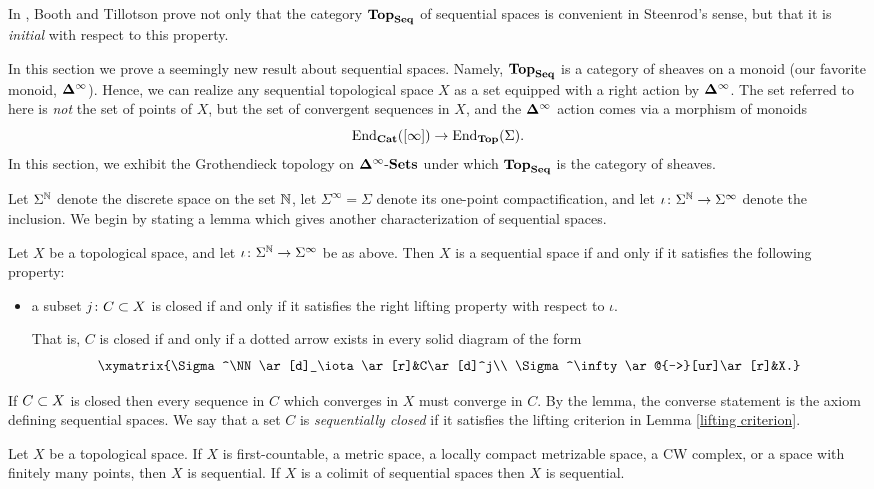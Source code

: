 \documentclass{amsart}
\def\Seq{{\bf Seq}}
\def\Del{{\bf \Delta}}
\def\dashSets{{\tn{-}\Sets}}
\def\Delinf{{\Del^\infty}}
\def\DSets{{\Delinf\dashSets}}
\begin{document}
In \cite[7.4]{BoT}, Booth and Tillotson prove not only that the category $\Top_\Seq$ of sequential spaces is convenient in Steenrod's sense, but that it is {\em initial} with respect to this property.  

In this section we prove a seemingly new result about sequential spaces.  Namely, $\Top_\Seq$ is a category of sheaves on a monoid (our favorite monoid, $\Delinf$).  Hence, we can realize any sequential topological space $X$ as a set equipped with a right action by $\Delinf$.  The set referred to here is {\em not} the set of points of $X$, but the set of convergent sequences in $X$, and the $\Delinf$ action comes via a morphism of monoids $$\End_\Cat([\infty])\to\End_\Top(\Sigma).$$  In this section, we exhibit the Grothendieck topology on $\DSets$ under which $\Top_\Seq$ is the category of sheaves.

Let $\Sigma^\NN$ denote the discrete space on the set $\NN$, let $\Sigma^\infty=\Sigma$ denote its one-point compactification, and let $\iota\taking\Sigma^\NN\to\Sigma^\infty$ denote the inclusion.  We begin by stating a lemma which gives another characterization of sequential spaces.

\begin{lemma}\label{lifting criterion}

Let $X$ be a topological space, and let $\iota\taking\Sigma^\NN\to\Sigma^\infty$ be as above.  Then $X$ is a sequential space if and only if it satisfies the following property: \begin{itemize}\item a subset $j\taking C\ss X$ is closed if and only if it satisfies the right lifting property with respect to $\iota$.

That is, $C$ is closed if and only if a dotted arrow exists in every solid diagram of the form $$\xymatrix{\Sigma^\NN\ar[d]_\iota\ar[r]&C\ar[d]^j\\ \Sigma^\infty\ar@{-->}[ur]\ar[r]&X.}$$\end{itemize}

\end{lemma}

If $C\ss X$ is closed then every sequence in $C$ which converges in $X$ must converge in $C$.  By the lemma, the converse statement is the axiom defining sequential spaces.  We say that a set $C$ is {\em sequentially closed} if it satisfies the lifting criterion in Lemma \ref{lifting criterion}.  

\begin{proposition}

Let $X$ be a topological space.  If $X$ is first-countable, a metric space, a locally compact metrizable space, a CW complex, or a space with finitely many points, then $X$ is sequential.  If $X$ is a colimit of sequential spaces then $X$ is sequential.

\end{proposition}
\end{document}
